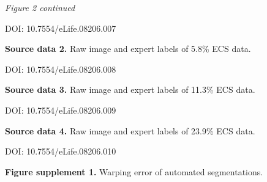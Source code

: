 \documentclass{article}
\begin{document}
\noindent \emph{Figure 2 continued}

\noindent DOI: 10.7554/eLife.08206.007

\noindent\textbf{Source data 2.} Raw image and expert labels of 5.8\% ECS data.

\noindent DOI: 10.7554/eLife.08206.008

\noindent\textbf{Source data 3.} Raw image and expert labels of 11.3\% ECS data.

\noindent DOI: 10.7554/eLife.08206.009

\noindent\textbf{Source data 4.} Raw image and expert labels of 23.9\% ECS data.

\noindent DOI: 10.7554/eLife.08206.010

\noindent\textbf{Figure supplement 1.} Warping error of automated segmentations.
\end{document}
